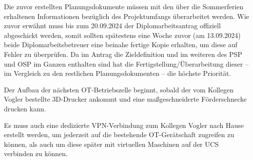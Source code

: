 \documentclass[
	headings=optiontotocandhead,%
	oneside,
	numbers=noenddot,%
	toc=flat, %
	10pt, %
	parskip=full, %
	listof=totoc, %
	listof=flat, %
	numbers=noenddot, %
	bibliography=totoc, %
	a4paper,DIV=14,
]{scrartcl}
\begin{document}
Die zuvor erstellten Planungsdokumente müssen mit den über die Sommerferien erhaltenen Informationen bezüglich des Projektumfangs überarbeitet werden. Wie zuvor erwähnt muss bis zum 20.09.2024 der Diplomarbeitsantrag offiziell abgeschickt werden, somit sollten spätestens eine Woche zuvor (am 13.09.2024) beide Diplomarbeitsbetreuer eine beinahe fertige Kopie erhalten, um diese auf Fehler zu überprüfen. Da im Antrag die Zieldefinition und im weiteren des PSP und OSP im Ganzen enthalten sind hat die Fertigstellung/Überarbeitung dieser -- im Vergleich zu den restlichen Planungsdokumenten -- die höchste Priorität.

Der Aufbau der nächsten OT-Betriebszelle beginnt, sobald der vom Kollegen Vogler bestellte 3D-Drucker ankommt und eine maßgeschneiderte Förderschnecke drucken kann.

Es muss auch eine dedizierte VPN-Verbindung zum Kollegen Vogler nach Hause erstellt werden, um jederzeit auf die bestehende OT-Gerätschaft zugreifen zu können, als auch um diese später mit virtuellen Maschinen auf der UCS verbinden zu können.
\end{document}
